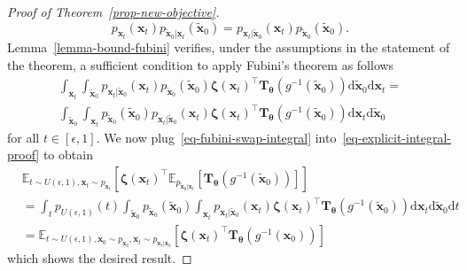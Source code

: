 \begin{proof}[Proof of Theorem~\ref{prop-new-objective}]
\begin{equation*}
 p_{\mathbf{x}_t}(\mathbf{x}_{t})  p_{\tilde{\mathbf{x}}_0\vert \mathbf{x}_t}(\tilde{\mathbf{x}}_{0})  = p_{\mathbf{x}_t|\tilde{\mathbf{x}}_{0}}(\mathbf{x}_{t}) p_{\tilde{\mathbf{x}}_{0}}(\tilde{\mathbf{x}}_{0}).
\end{equation*}
Lemma~\ref{lemma-bound-fubini} verifies, under the assumptions in the statement of the theorem, a sufficient condition to apply Fubini's theorem as follows
\begin{multline}
\label{eq-fubini-swap-integral}
\int_{\mathbf{x}_t} \int_{\tilde{\mathbf{x}}_0} p_{\mathbf{x}_t|\tilde{\mathbf{x}}_{0}}(\mathbf{x}_{t}) p_{\tilde{\mathbf{x}}_{0}}(\tilde{\mathbf{x}}_{0}) \boldsymbol{\zeta}(\mathbf{x}_t)^{\top}\mathbf{T}_{\boldsymbol{\theta}}(g^{-1}(\tilde{\mathbf{x}}_{0})) \mathrm{d}\tilde{\mathbf{x}}_{0}\mathrm{d}\mathbf{x}_t = \\ \int_{\tilde{\mathbf{x}}_0}   \int_{\mathbf{x}_t}  p_{\tilde{\mathbf{x}}_{0}}(\tilde{\mathbf{x}}_{0}) p_{\mathbf{x}_t|\tilde{\mathbf{x}}_{0}}(\mathbf{x}_{t}) \boldsymbol{\zeta}(\mathbf{x}_t)^{\top}\mathbf{T}_{\boldsymbol{\theta}}(g^{-1}(\tilde{\mathbf{x}}_{0}))\mathrm{d}\mathbf{x}_t\mathrm{d}\tilde{\mathbf{x}}_{0}
\end{multline}
for all $t\in[\epsilon,1]$.
We now plug~\eqref{eq-fubini-swap-integral} into~\eqref{eq-explicit-integral-proof} to obtain
\begin{equation*}
\begin{aligned}
&\mathbb{E}_{t\sim U(\epsilon, 1), \mathbf{x}_t \sim p_{\mathbf{x}_t}}\left[\boldsymbol{\zeta}(\mathbf{x}_t)^{\top}\mathbb{E}_{p_{\tilde{\mathbf{x}}_{0}\vert\mathbf{x}_t}}[\mathbf{T}_{\boldsymbol{\theta}}(g^{-1}(\tilde{\mathbf{x}}_{0}))]\right] \\ 
 &= \int_{t} p_{ U(\epsilon, 1)}(t)\int_{\tilde{\mathbf{x}}_0}  p_{\tilde{\mathbf{x}}_{0}}(\tilde{\mathbf{x}}_{0})  \int_{\mathbf{x}_t}   p_{\mathbf{x}_t|\tilde{\mathbf{x}}_{0}}(\mathbf{x}_{t}) \boldsymbol{\zeta}(\mathbf{x}_t)^{\top}\mathbf{T}_{\boldsymbol{\theta}}(g^{-1}(\tilde{\mathbf{x}}_{0}))\mathrm{d}\mathbf{x}_t\mathrm{d}\tilde{\mathbf{x}}_{0}\mathrm{d}t \\ 
&=\mathbb{E}_{t\sim U(\epsilon, 1),\mathbf{x}_0\sim  p_{\mathbf{x}_0}, \mathbf{x}_t \sim p_{\mathbf{x}_t|\mathbf{x}_0} }\left[\boldsymbol{\zeta}(\mathbf{x}_t)^{\top}\mathbf{T}_{\boldsymbol{\theta}}(g^{-1}({\mathbf{x}}_{0}))\right]
\end{aligned}
\end{equation*}
which shows the desired result.
\end{proof}